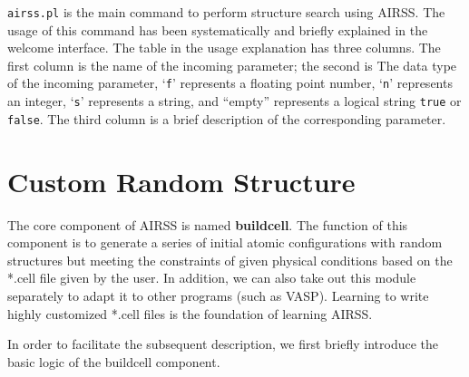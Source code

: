 \documentclass[a4paper, 10pt]{article}
\begin{document}
\verb|airss.pl| is the main command to perform structure search using AIRSS. The usage of this command has been systematically and briefly explained in the welcome interface. The table in the usage explanation has three columns. The first column is the name of the incoming parameter; the second is The data type of the incoming parameter,  `\verb|f|' represents a floating point number,  `\verb|n|' represents an integer,  `\verb|s|' represents a string, and ``empty'' represents a logical string \verb!true! or \verb!false!. The third column is a brief description of the corresponding parameter.

\newpage
\section{Custom Random Structure}

The core component of AIRSS is named \textbf{buildcell}. The function of this component is to generate a series of initial atomic configurations with random structures but meeting the constraints of given physical conditions based on the *.cell file given by the user. In addition, we can also take out this module separately to adapt it to other programs (such as VASP). Learning to write highly customized *.cell files is the foundation of learning AIRSS.

In order to facilitate the subsequent description, we first briefly introduce the basic logic of the buildcell component.
\end{document}
